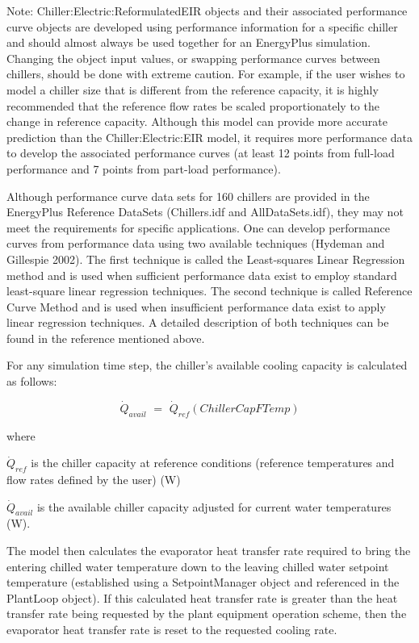 Note: Chiller:Electric:ReformulatedEIR objects and their associated performance curve objects are developed using performance information for a specific chiller and should almost always be used together for an EnergyPlus simulation. Changing the object input values, or swapping performance curves between chillers, should be done with extreme caution. For example, if the user wishes to model a chiller size that is different from the reference capacity, it is highly recommended that the reference flow rates be scaled proportionately to the change in reference capacity. Although this model can provide more accurate prediction than the Chiller:Electric:EIR model, it requires more performance data to develop the associated performance curves (at least 12 points from full-load performance and 7 points from part-load performance).

Although performance curve data sets for 160 chillers are provided in the EnergyPlus Reference DataSets (Chillers.idf and AllDataSets.idf), they may not meet the requirements for specific applications. One can develop performance curves from performance data using two available techniques (Hydeman and Gillespie 2002). The first technique is called the Least-squares Linear Regression method and is used when sufficient performance data exist to employ standard least-square linear regression techniques. The second technique is called Reference Curve Method and is used when insufficient performance data exist to apply linear regression techniques. A detailed description of both techniques can be found in the reference mentioned above.

For any simulation time step, the chiller's available cooling capacity is calculated as follows:

\begin{equation}
{\dot{Q}_{avail}}\,\, = \,\,{\dot{Q}_{ref}}\left( {ChillerCapFTemp} \right)
\end{equation}

where

\({\dot{Q}_{ref}}\) is the chiller capacity at reference conditions (reference temperatures and flow rates defined by the user) (W)

\({\dot{Q}_{avail}}\) is the available chiller capacity adjusted for current water temperatures (W).

The model then calculates the evaporator heat transfer rate required to bring the entering chilled water temperature down to the leaving chilled water setpoint temperature (established using a SetpointManager object and referenced in the PlantLoop object). If this calculated heat transfer rate is greater than the heat transfer rate being requested by the plant equipment operation scheme, then the evaporator heat transfer rate is reset to the requested cooling rate.

